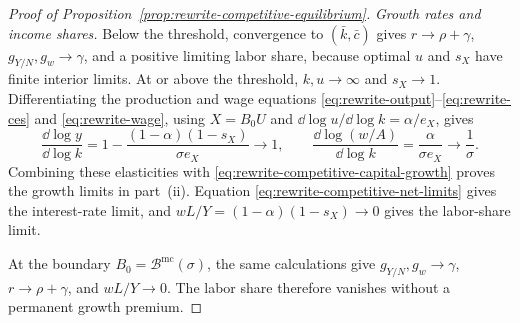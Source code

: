 \begin{proof}[Proof of Proposition~\ref{prop:rewrite-competitive-equilibrium}]
\emph{Growth rates and income shares.}
Below the threshold, convergence to $(\bar k,\bar c)$ gives
$r\to\rho+\gamma$, $g_{Y/N},g_w\to\gamma$, and a positive limiting
labor share, because optimal $u$ and $s_X$ have finite interior limits.
At or above the threshold, $k,u\to\infty$ and $s_X\to1$.
Differentiating the production and wage equations
\eqref{eq:rewrite-output}--\eqref{eq:rewrite-ces} and
\eqref{eq:rewrite-wage}, using $X=B_0U$ and
$\dd\log u/\dd\log k=\alpha/e_X$, gives
\[
 \frac{\dd\log y}{\dd\log k}
 =1-\frac{(1-\alpha)(1-s_X)}{\sigma e_X}\longrightarrow1,
 \qquad
 \frac{\dd\log(w/A)}{\dd\log k}
 =\frac{\alpha}{\sigma e_X}\longrightarrow\frac1\sigma.
\]
Combining these elasticities with
\eqref{eq:rewrite-competitive-capital-growth} proves the growth limits
in part~(ii). Equation
\eqref{eq:rewrite-competitive-net-limits} gives the interest-rate limit,
and $wL/Y=(1-\alpha)(1-s_X)\to0$ gives the labor-share limit.

At the boundary $B_0=\mathcal B^{\mathrm{mc}}(\sigma)$, the same
calculations give $g_{Y/N},g_w\to\gamma$, $r\to\rho+\gamma$, and
$wL/Y\to0$. The labor share therefore vanishes without a permanent
growth premium.
\end{proof}
